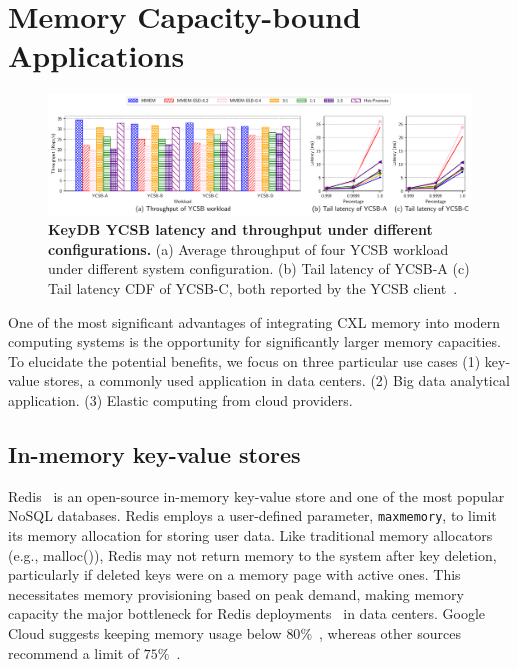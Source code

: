 
\section{Memory Capacity-bound Applications}
\label{sec:capacity}


\begin{figure}[t]
\centering
  \includegraphics[width=1\textwidth]{fig/cxl/redis_ycsb_cxl.pdf}
  \caption{\textbf{KeyDB YCSB latency and throughput under different configurations.} (a) Average throughput of four YCSB workload under different system configuration. (b) Tail latency of YCSB-A (c) Tail latency CDF of YCSB-C, both reported by the YCSB client~\cite{YCSB}.}
  \label{fig:ycsb_cxl}
\end{figure}

One of the most significant advantages of integrating CXL memory into modern computing systems is the opportunity for significantly larger memory capacities. To elucidate the potential benefits, we focus on three particular use cases (1) key-value stores, a commonly used application in data centers. (2) Big data analytical application. (3) Elastic computing from cloud providers.

\subsection{In-memory key-value stores}
\label{ssec:keydb}
Redis~\cite{redis} is an open-source in-memory key-value store and one of the most popular NoSQL databases. Redis employs a user-defined parameter, \texttt{maxmemory}, to limit its memory allocation for storing user data. Like traditional memory allocators (e.g., malloc()), Redis may not return memory to the system after key deletion, particularly if deleted keys were on a memory page with active ones. This necessitates memory provisioning based on peak demand, making memory capacity the major bottleneck for Redis deployments~\cite{manageredis} in data centers. Google Cloud suggests keeping memory usage below $80\%$~\cite{googlecloud}, whereas other sources recommend a limit of $75\%$~\cite{manageredis}. 

